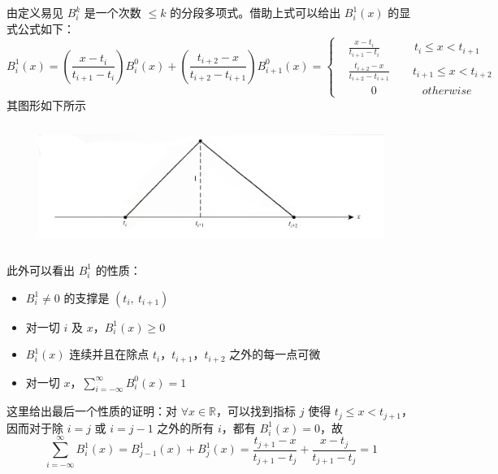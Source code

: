 \documentclass[a4paper]{article}
\begin{document}
    由定义易见 $B_i^k$ 是一个次数 $\leqslant k$ 的分段多项式。借助上式可以给出 $B_i^1(x)$ 的显式公式如下：
    \begin{equation}
    \label{expression-1-B-Spline}
        B_i^1(x) = \left(\frac{x - t_i}{t_{i+1} - t_{i}}\right) B_i^0(x) + \left(\frac{t_{i+2} - x}{t_{i+2} - t_{i+1}}\right) B_{i+1}^0(x)
        = \left\{\begin{aligned}
            & \frac{x - t_i}{t_{i+1} - t_{i}} \quad\qquad t_{i} \leqslant x < t_{i+1} \\
            & \frac{t_{i+2} - x}{t_{i+2} - t_{i+1}} \qquad t_{i+1} \leqslant x < t_{i+2} \\
            & \qquad 0 \qquad\qquad otherwise
        \end{aligned}\right.
    \end{equation}
    其图形如下所示
    \begin{figure}[H]
        \centering
        \includegraphics[width = 12cm, height = 4cm]{1-order-BSpline.png}
    \end{figure}

    \noindent 此外可以看出 $B_i^1$ 的性质：
    \begin{itemize}
        \item $B_i^1 \neq 0$ 的支撑是 $(t_{i},\ t_{i+1})$
        \item 对一切 $i$ 及 $x$，$B_i^1(x) \geqslant 0$
        \item $B_i^1(x)$ 连续并且在除点 $t_{i}$，$t_{i+1}$，$t_{i+2}$ 之外的每一点可微
        \item 对一切 $x$，$\displaystyle\sum_{i = -\infty}^{\infty} B_i^0(x) = 1$
    \end{itemize}

    这里给出最后一个性质的证明：对 $\forall x \in \mathbb{R}$，可以找到指标 $j$ 使得 $t_{j} \leqslant x < t_{j+1}$，因而对于除 $i = j$ 或 $i = j - 1$ 之外的所有 $i$，都有 $B_i^1(x) = 0$，故
    \begin{equation}
        \sum_{i = -\infty}^{\infty} B_i^1(x) = B_{j-1}^1(x) + B_{j}^1(x) = \frac{t_{j+1} - x}{t_{j+1} - t_j} + \frac{x - t_j}{t_{j+1} - t_{j}} = 1
    \end{equation}
\end{document}
